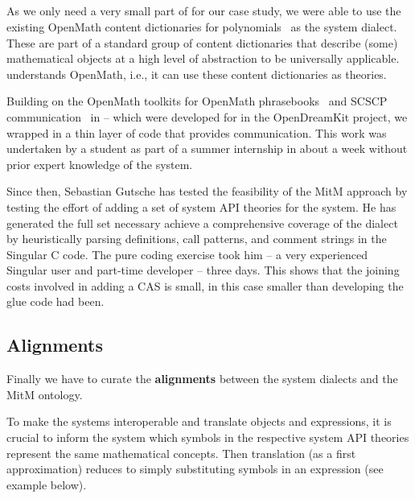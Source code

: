 \subsection{\Singular}\label{sec:apit:singular}

As we only need a very small part of \Singular for our case study, we were able to use the existing OpenMath content dictionaries for polynomials~\cite{OMCD:poly:on} as the \Singular system dialect.
These are part of a standard group of content dictionaries that describe (some) mathematical objects at a high level of abstraction to be universally applicable.
\OMMT understands OpenMath, i.e., it can use these content dictionaries as \OMMT theories.

Building on the OpenMath toolkits for OpenMath phrasebooks~\cite{py-openmath:on} and SCSCP communication~\cite{py-scscp:on} in {\Python} -- which were developed for \Sage in the
OpenDreamKit project, we wrapped \Singular in a thin layer of \Python code that provides \SCSCP communication.
This work was undertaken by a student as part of a summer internship in about a week without prior expert knowledge of the system.

Since then, Sebastian Gutsche has tested the feasibility of the MitM approach by testing the effort of adding a set of system API theories for the \Singular system. He has generated the full set necessary achieve a comprehensive coverage of the \Singular dialect by heuristically parsing definitions, call patterns, and comment strings in the Singular C code. The pure coding exercise took him -- a very experienced Singular user and part-time developer -- three days. This shows that the joining costs involved in adding a CAS is small, in this case smaller than developing the \Sage glue code had been.  



\subsection{Alignments}\label{sec:integrating:alignments}

Finally we have to curate the \textbf{alignments} between the system dialects and the MitM ontology. 

To make the systems interoperable and translate objects and expressions, it is crucial to inform the system which symbols in the 
respective system API theories represent the same mathematical concepts. Then translation (as a first approximation) reduces to simply substituting symbols in an expression (see example below).\medskip

